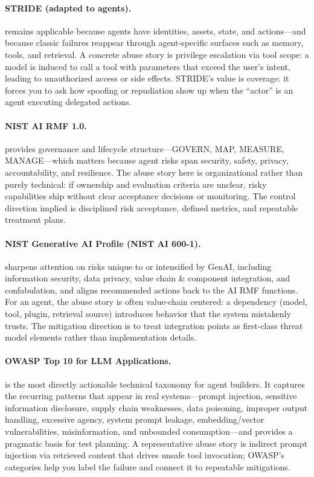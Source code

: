 \begin{TNtwocol}
  \paragraph{STRIDE (adapted to agents).} remains applicable because agents have identities, assets, state, and actions—and because classic failures reappear through agent-specific surfaces such as memory, tools, and retrieval. A concrete abuse story is privilege escalation via tool scope: a model is induced to call a tool with parameters that exceed the user's intent, leading to unauthorized access or side effects. STRIDE's value is coverage: it forces you to ask how spoofing or repudiation show up when the “actor” is an agent executing delegated actions. \cite{nist-sp800-53b,owasp-top10-llm-2025}

  \paragraph{NIST AI RMF 1.0.} provides governance and lifecycle structure—GOVERN, MAP, MEASURE, MANAGE—which matters because agent risks span security, safety, privacy, accountability, and resilience. The abuse story here is organizational rather than purely technical: if ownership and evaluation criteria are unclear, risky capabilities ship without clear acceptance decisions or monitoring. The control direction implied is disciplined risk acceptance, defined metrics, and repeatable treatment plans. \cite{nist-airmf-100-1,nist-genai-600-1}

  \paragraph{NIST Generative AI Profile (NIST AI 600-1).} sharpens attention on risks unique to or intensified by GenAI, including information security, data privacy, value chain \& component integration, and confabulation, and aligns recommended actions back to the AI RMF functions. For an agent, the abuse story is often value-chain centered: a dependency (model, tool, plugin, retrieval source) introduces behavior that the system mistakenly trusts. The mitigation direction is to treat integration points as first-class threat model elements rather than implementation details. \cite{nist-genai-600-1,nist-airmf-100-1}

  \paragraph{OWASP Top 10 for LLM Applications.} is the most directly actionable technical taxonomy for agent builders. It captures the recurring patterns that appear in real systems—prompt injection, sensitive information disclosure, supply chain weaknesses, data poisoning, improper output handling, excessive agency, system prompt leakage, embedding/vector vulnerabilities, misinformation, and unbounded consumption—and provides a pragmatic basis for test planning. A representative abuse story is indirect prompt injection via retrieved content that drives unsafe tool invocation; OWASP's categories help you label the failure and connect it to repeatable mitigations. \cite{owasp-top10-llm-2025,owasp-prompt-injection-cheatsheet}


\end{TNtwocol}
